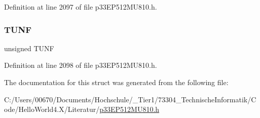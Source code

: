 Definition at line 2097 of file p33\+E\+P512\+M\+U810.\+h.

\mbox{\label{structtag_d_c_i_s_t_a_t_b_i_t_s_a1e6631b91a8ea3dc49c1fb4294189225}} 
\subsubsection{\texorpdfstring{T\+U\+NF}{TUNF}}
{\footnotesize\ttfamily unsigned T\+U\+NF}



Definition at line 2098 of file p33\+E\+P512\+M\+U810.\+h.



The documentation for this struct was generated from the following file\+:\begin{DoxyCompactItemize}
\item 
C\+:/\+Users/00670/\+Documents/\+Hochschule/\+\_\+\+Tier1/73304\+\_\+\+Technische\+Informatik/\+Code/\+Hello\+World4.\+X/\+Literatur/\hyperlink{p33_e_p512_m_u810_8h}{p33\+E\+P512\+M\+U810.\+h}\end{DoxyCompactItemize}
